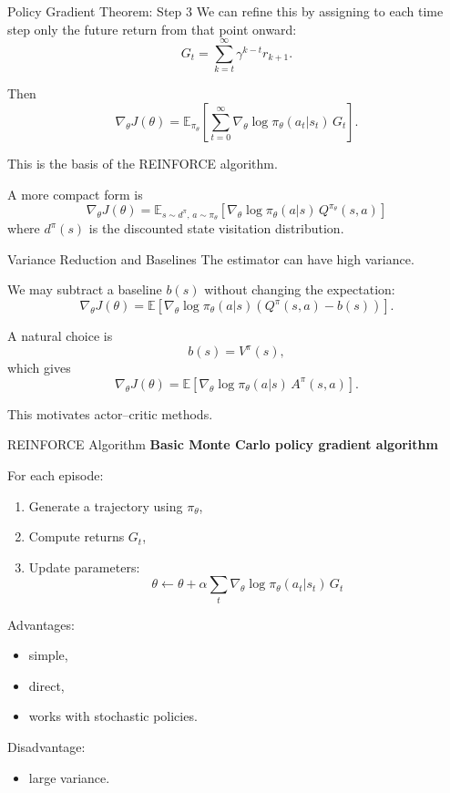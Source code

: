 \documentclass[aspectratio=169]{beamer}
\begin{document}
\begin{frame}{Policy Gradient Theorem: Step 3}
  We can refine this by assigning to each time step only the future return from that point onward:
  \[
  G_t=\sum_{k=t}^\infty \gamma^{k-t}r_{k+1}.
  \]

  Then
  \[
  \nabla_\theta J(\theta)=
  \mathbb{E}_{\pi_\theta}
  \left[
    \sum_{t=0}^\infty \nabla_\theta \log \pi_\theta(a_t|s_t)\,G_t
    \right].
  \]

  This is the basis of the REINFORCE algorithm.

  A more compact form is
  \[
  \nabla_\theta J(\theta)=
  \mathbb{E}_{s\sim d^\pi,\,a\sim \pi_\theta}
  \left[
    \nabla_\theta \log \pi_\theta(a|s)\,Q^{\pi_\theta}(s,a)
    \right]
  \]
  where $d^\pi(s)$ is the discounted state visitation distribution.
\end{frame}

\begin{frame}{Variance Reduction and Baselines}
  The estimator can have high variance.

  We may subtract a baseline $b(s)$ without changing the expectation:
  \[
  \nabla_\theta J(\theta)=
  \mathbb{E}\left[
    \nabla_\theta \log \pi_\theta(a|s)\left(Q^\pi(s,a)-b(s)\right)
    \right].
  \]

  A natural choice is
  \[
  b(s)=V^\pi(s),
  \]
  which gives
  \[
  \nabla_\theta J(\theta)=
  \mathbb{E}\left[
    \nabla_\theta \log \pi_\theta(a|s)\,A^\pi(s,a)
    \right].
  \]

  This motivates actor--critic methods.
\end{frame}

\begin{frame}{REINFORCE Algorithm}
  \textbf{Basic Monte Carlo policy gradient algorithm}

  For each episode:
  \begin{enumerate}
  \item Generate a trajectory using $\pi_\theta$,
  \item Compute returns $G_t$,
  \item Update parameters:
    \[
    \theta \leftarrow \theta + \alpha
    \sum_t \nabla_\theta \log \pi_\theta(a_t|s_t)\,G_t
    \]
  \end{enumerate}

  Advantages:
  \begin{itemize}
  \item simple,
  \item direct,
  \item works with stochastic policies.
  \end{itemize}

  Disadvantage:
  \begin{itemize}
  \item large variance.
  \end{itemize}
\end{frame}
\end{document}
